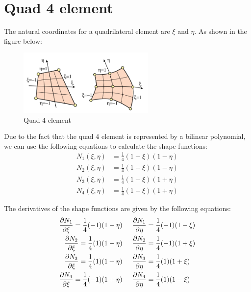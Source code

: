 \documentclass{article}  %
\begin{document}
\section{Quad 4 element}
The natural coordinates for a quadrilateral element are $\xi$ and $\eta$. As shown in the figure below:
\begin{figure}[h]
    \centering
    \includegraphics[width=0.6\textwidth]{Graphics/quad_4.PNG}
    \caption{Quad 4 element}
    \label{fig:quad_4_element}
\end{figure}

Due to the fact that the quad 4 element is represented by a bilinear polynomial, we can use the following equations to calculate the shape functions:
\begin{align}
  N_1(\xi,\eta) &= \frac{1}{4} (1-\xi)(1-\eta) \\
  N_2(\xi,\eta) &= \frac{1}{4} (1+\xi)(1-\eta) \\
  N_3(\xi,\eta) &= \frac{1}{4} (1+\xi)(1+\eta) \\
  N_4(\xi,\eta) &= \frac{1}{4} (1-\xi)(1+\eta)
\end{align}

The derivatives of the shape functions are given by the following equations:
\begin{align}
  \frac{\partial N_1}{\partial \xi} = \frac{1}{4} (-1)(1-\eta) & \hspace{0.5cm}
  \frac{\partial N_1}{\partial \eta} = \frac{1}{4} (-1)(1-\xi) \\
  \frac{\partial N_2}{\partial \xi} = \frac{1}{4} (1)(1-\eta) & \hspace{0.5cm}
  \frac{\partial N_2}{\partial \eta} = \frac{1}{4} (-1)(1+\xi) \\
  \frac{\partial N_3}{\partial \xi} = \frac{1}{4} (1)(1+\eta) & \hspace{0.5cm}
  \frac{\partial N_3}{\partial \eta} = \frac{1}{4} (1)(1+\xi) \\
  \frac{\partial N_4}{\partial \xi} = \frac{1}{4} (-1)(1+\eta) & \hspace{0.5cm}
  \frac{\partial N_4}{\partial \eta} = \frac{1}{4} (1)(1-\xi) \\
\end{align}
\end{document}
